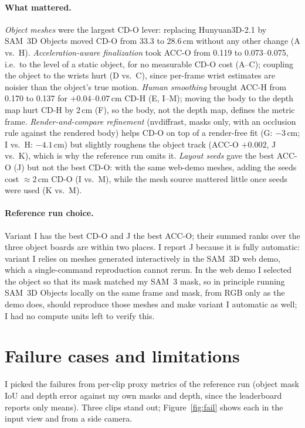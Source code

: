 \documentclass[10pt,twocolumn]{article}
\begin{document}
\paragraph{What mattered.}
\emph{Object meshes} were the largest CD-O lever: replacing Hunyuan3D-2.1 by SAM~3D Objects moved CD-O from
33.3 to 28.6\,cm without any other change (A vs.\ H).
\emph{Acceleration-aware finalization} took ACC-O from 0.119 to 0.073--0.075, i.e.\ to the level of a static
object, for no measurable CD-O cost (A--C); coupling the object to the wrists hurt (D vs.\ C), since per-frame wrist
estimates are noisier than the object's true motion.
\emph{Human smoothing} brought ACC-H from 0.170 to 0.137 for $+0.04$--$0.07$\,cm CD-H (E, I--M); moving the body to
the depth map hurt CD-H by 2\,cm (F), so the body, not the depth map, defines the metric frame.
\emph{Render-and-compare refinement} (nvdiffrast, masks only, with an occlusion rule against the rendered body)
helps CD-O on top of a render-free fit (G: $-3$\,cm; I vs.\ H: $-4.1$\,cm) but slightly roughens the object track
(ACC-O $+0.002$, J vs.\ K), which is why the reference run omits it.
\emph{Layout seeds} gave the best ACC-O (J) but not the best CD-O: with the same web-demo meshes, adding the seeds
cost $\approx$2\,cm CD-O (I vs.\ M), while the mesh source mattered little once seeds were used (K vs.\ M).

\paragraph{Reference run choice.}
Variant I has the best CD-O and J the best ACC-O; their summed ranks over the three object boards are within two
places. I report J because it is fully automatic: variant I relies on meshes generated interactively in the SAM~3D web
demo, which a single-command reproduction cannot rerun. In the web demo I selected the object so that its
mask matched my SAM~3 mask, so in principle running SAM~3D Objects locally on the same frame and mask, from RGB
only as the demo does, should reproduce those meshes and make variant I automatic as well; I had no compute units left to
verify this.

\section{Failure cases and limitations}
I picked the failures from per-clip proxy metrics of the reference run (object mask IoU and depth error against
my own masks and depth, since the leaderboard reports only means). Three clips stand out; Figure~\ref{fig:fail}
shows each in the input view and from a side camera.
\end{document}
